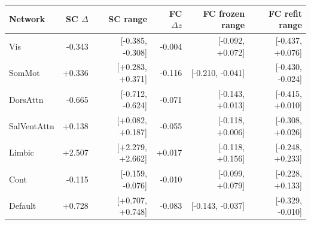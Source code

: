 \begin{tabular}{lrrrrr}
\toprule
Network & SC $\Delta$ & SC range & FC $\Delta z$ & FC frozen range & FC refit range \\
\midrule
Vis & -0.343 & [-0.385, -0.308] & -0.004 & [-0.092, +0.072] & [-0.437, +0.076] \\
SomMot & +0.336 & [+0.283, +0.371] & -0.116 & [-0.210, -0.041] & [-0.430, -0.024] \\
DorsAttn & -0.665 & [-0.712, -0.624] & -0.071 & [-0.143, +0.013] & [-0.415, +0.010] \\
SalVentAttn & +0.138 & [+0.082, +0.187] & -0.055 & [-0.118, +0.006] & [-0.308, +0.026] \\
Limbic & +2.507 & [+2.279, +2.662] & +0.017 & [-0.118, +0.156] & [-0.248, +0.233] \\
Cont & -0.115 & [-0.159, -0.076] & -0.010 & [-0.099, +0.079] & [-0.228, +0.133] \\
Default & +0.728 & [+0.707, +0.748] & -0.083 & [-0.143, -0.037] & [-0.329, -0.010] \\
\bottomrule
\end{tabular}

